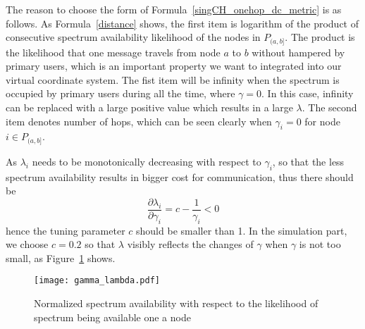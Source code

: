 The reason to choose the form of Formula~\ref{singCH_onehop_dc_metric} is as follows.
As Formula~\ref{distance} shows, the first item is logarithm of the product of consecutive spectrum availability likelihood of the nodes in $P_{(a,b]}$.
The product is the likelihood that one message travels from node $a$ to $b$ without hampered by primary users, which is an important property we want to integrated into our virtual coordinate system.
The fist item will be infinity when the spectrum is occupied by primary users during all the time, where $\gamma=0$.
In this case, infinity can be replaced with a large positive value which results in a large $\lambda$.
The second item denotes number of hops, which can be seen clearly when $\gamma_i=0$ for node $i\in P_{(a,b]}$.

As $\lambda_i$ needs to be monotonically decreasing with respect to $\gamma_i$, so that the less spectrum availability results in bigger cost for communication, thus there should be
\begin{equation}
\frac{\partial\lambda_i}{\partial\gamma_i} = c -\frac{1}{\gamma_i} <0
\label{singCH_dc_metric_decreasing}
\end{equation} 
hence the tuning parameter $c$ should be smaller than 1.
In the simulation part, we choose $c=0.2$ so that $\lambda$ visibly reflects the changes of $\gamma$ when $\gamma$ is not too small, as Figure~\ref{fig:gamma_lambda} shows.

\begin{figure}
\centering
\texttt{[image: gamma\_lambda.pdf]}
\caption{Normalized spectrum availability with respect to the likelihood of spectrum being available one a node}
\label{fig:gamma_lambda}
\end{figure}





